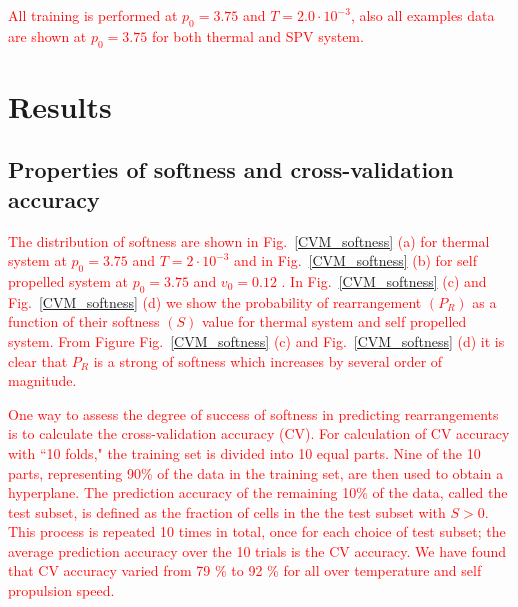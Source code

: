 \documentclass[twoside,twocolumn,9pt]{article}
\begin{document}
\textcolor{red}{All training is performed at $p_0=3.75$ and $T=2.0\cdot 10^{-3}$, also  all examples data are shown at $p_0=3.75$ for both thermal and SPV system.}

\section{Results}
\subsection{Properties of softness and cross-validation accuracy}

\textcolor{red}{
The distribution of softness are shown in Fig.~\ref{CVM_softness} (a)  for thermal system at $p_0=3.75$ and $T=2\cdot 10^{-3}$  and in Fig.~\ref{CVM_softness} (b) for self propelled system at $p_0=3.75$ and $v_0=0.12$ . In Fig.~\ref{CVM_softness} (c) and Fig.~\ref{CVM_softness} (d) we show the probability of rearrangement $(P_R)$ as a function of their softness $(S)$ value for thermal system and self propelled system. From Figure Fig.~\ref{CVM_softness} (c) and Fig.~\ref{CVM_softness} (d) it is clear that $P_R$ is a strong of softness which increases by several order of magnitude.}

\textcolor{red}{
One way to assess the degree of success of softness in predicting rearrangements is to calculate the cross-validation accuracy (CV). For calculation of CV accuracy with ``10 folds," the training set is divided into 10 equal parts. Nine of the 10 parts, representing 90\% of the data in the training set, are then used to obtain a hyperplane. The prediction accuracy of the remaining 10\% of the data, called the test subset, is defined as the fraction of cells in the the test subset with $S>0$. This process is repeated 10 times in total, once for each choice of test subset; the average prediction accuracy over the 10 trials is the CV accuracy. 
We have found that CV accuracy varied from 79 \% to 92 \% for all over temperature and self propulsion speed.}

\end{document}

